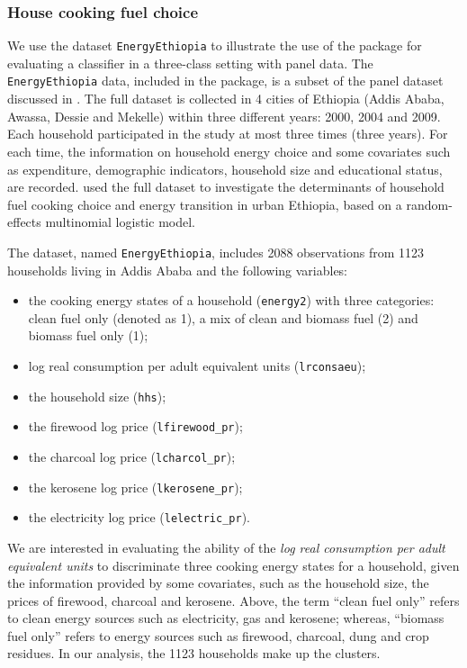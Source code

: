 {
\hypertarget{house-cooking-fuel-choice}{%
\subsubsection{House cooking fuel
choice}\label{house-cooking-fuel-choice}}

We use the dataset \texttt{EnergyEthiopia} to illustrate the use of the package for evaluating a classifier in a three-class setting with panel data. The \texttt{EnergyEthiopia} data, included in the package, is a subset of the panel dataset discussed in \citet{alem2016modeling}. The full dataset is collected in 4 cities of Ethiopia (Addis Ababa, Awassa, Dessie and Mekelle) within three different years: 2000, 2004 and 2009. Each household participated in the study at most three times (three years). For each time, the information on household energy choice and some covariates such as expenditure, demographic indicators, household size and educational status, are recorded. \citet{alem2016modeling} used the full dataset to investigate the determinants of household fuel cooking choice and energy transition in urban Ethiopia, based on a random-effects multinomial logistic model.

The dataset, named \texttt{EnergyEthiopia}, includes 2088 observations from 1123 households living in Addis Ababa and the following variables:
\begin{itemize}
\item the cooking energy states of a household (\texttt{energy2}) with three categories: clean fuel only (denoted as 1), a mix of clean and biomass fuel (2) and biomass fuel only (1);
\item log real consumption per adult equivalent units (\texttt{lrconsaeu});
\item the household size (\texttt{hhs});
\item the firewood log price (\texttt{lfirewood\_pr});
\item the charcoal log price (\texttt{lcharcol\_pr});
\item the kerosene log price (\texttt{lkerosene\_pr});
\item the electricity log price (\texttt{lelectric\_pr}).
\end{itemize}

We are interested in evaluating the ability of the \emph{log real consumption per adult equivalent units} to discriminate three cooking energy states for a household, given the information provided by some covariates, such as the household size, the prices of firewood, charcoal and kerosene. Above, the term ``clean fuel only'' refers to clean energy sources such as electricity, gas and kerosene; whereas, ``biomass fuel only'' refers to energy sources such as firewood, charcoal, dung and crop residues. In our analysis, the 1123 households make up the clusters.

}
